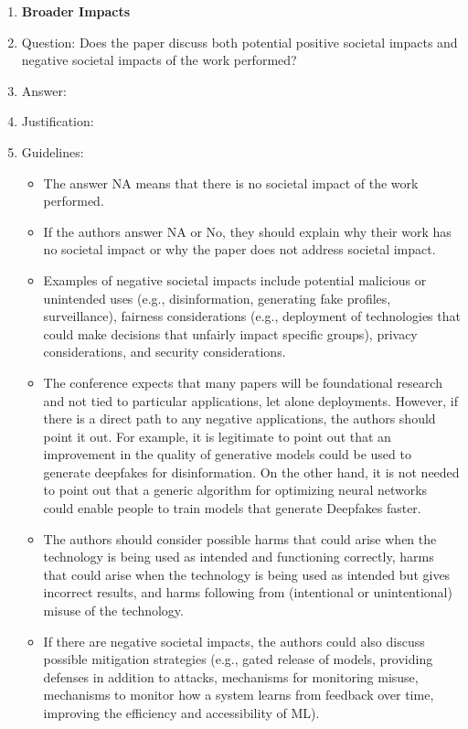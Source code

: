 \documentclass{article}
\begin{document}
\begin{enumerate}
\item {\bf Broader Impacts}
    \item[] Question: Does the paper discuss both potential positive societal impacts and negative societal impacts of the work performed?
    \item[] Answer: \answerNA{} %
    \item[] Justification: 
    \item[] Guidelines:
    \begin{itemize}
        \item The answer NA means that there is no societal impact of the work performed.
        \item If the authors answer NA or No, they should explain why their work has no societal impact or why the paper does not address societal impact.
        \item Examples of negative societal impacts include potential malicious or unintended uses (e.g., disinformation, generating fake profiles, surveillance), fairness considerations (e.g., deployment of technologies that could make decisions that unfairly impact specific groups), privacy considerations, and security considerations.
        \item The conference expects that many papers will be foundational research and not tied to particular applications, let alone deployments. However, if there is a direct path to any negative applications, the authors should point it out. For example, it is legitimate to point out that an improvement in the quality of generative models could be used to generate deepfakes for disinformation. On the other hand, it is not needed to point out that a generic algorithm for optimizing neural networks could enable people to train models that generate Deepfakes faster.
        \item The authors should consider possible harms that could arise when the technology is being used as intended and functioning correctly, harms that could arise when the technology is being used as intended but gives incorrect results, and harms following from (intentional or unintentional) misuse of the technology.
        \item If there are negative societal impacts, the authors could also discuss possible mitigation strategies (e.g., gated release of models, providing defenses in addition to attacks, mechanisms for monitoring misuse, mechanisms to monitor how a system learns from feedback over time, improving the efficiency and accessibility of ML).
    \end{itemize}
    

\end{enumerate}
\end{document}
